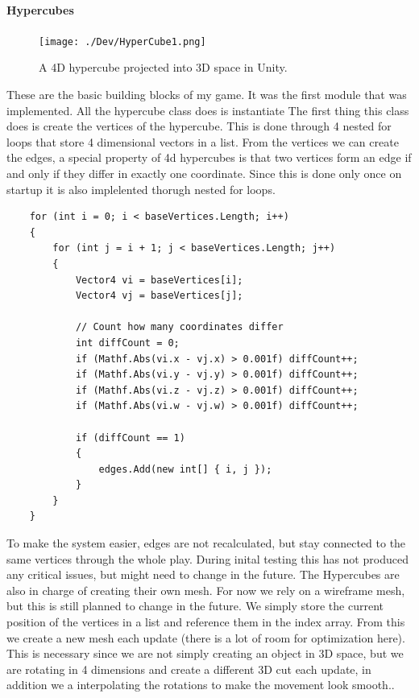 \documentclass{article}
\begin{document}
\paragraph{Hypercubes}
\begin{figure}
    \label{fig:hypercube}
    \centering
    \texttt{[image: ./Dev/HyperCube1.png]}
    \caption{A 4D hypercube projected into 3D space in Unity.}
\end{figure}
These are the basic building blocks of my game. It was the first module that was implemented. All the hypercube class does is instantiate 
The first thing this class does is create the vertices of the hypercube. This is done through 4 nested for loops that store 4 dimensional vectors in a list. 
From the vertices we can create the edges, a special property of 4d hypercubes is that two vertices form an edge if and only if they differ in exactly one coordinate. Since this is done only once on startup it is also implelented thorugh nested for loops.
\begin{verbatim}
    for (int i = 0; i < baseVertices.Length; i++)
    {
        for (int j = i + 1; j < baseVertices.Length; j++)
        {
            Vector4 vi = baseVertices[i];
            Vector4 vj = baseVertices[j];

            // Count how many coordinates differ
            int diffCount = 0;
            if (Mathf.Abs(vi.x - vj.x) > 0.001f) diffCount++;
            if (Mathf.Abs(vi.y - vj.y) > 0.001f) diffCount++;
            if (Mathf.Abs(vi.z - vj.z) > 0.001f) diffCount++;
            if (Mathf.Abs(vi.w - vj.w) > 0.001f) diffCount++;

            if (diffCount == 1)
            {
                edges.Add(new int[] { i, j });
            }
        }
    }
\end{verbatim}
To make the system easier, edges are not recalculated, but stay connected to the same vertices through the whole play. During inital testing this has not produced any critical issues, but might need to change in the future.
The Hypercubes are also in charge of creating their own mesh. For now we rely on a wireframe mesh, but this is still planned to change in the future. We simply store the current position of the vertices in a list and reference them in the index array. From this we create a new mesh each update (there is a lot of room for optimization here). This is necessary since we are not simply creating an object in 3D space, but we are rotating in 4 dimensions and create a different 3D cut each update, in addition we a interpolating the rotations to make the movement look smooth..
\end{document}

